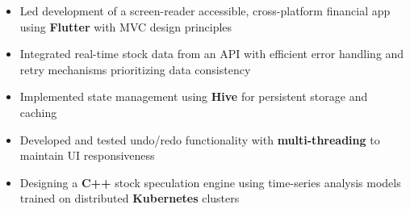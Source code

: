 \begin{itemize}
  \item Led development of a screen-reader accessible, cross-platform financial app using \textbf{Flutter} with MVC design principles
  \item Integrated real-time stock data from an API with efficient error handling and retry mechanisms prioritizing data consistency
  \item Implemented state management using \textbf{Hive} for persistent storage and caching
  \item Developed and tested undo/redo functionality with \textbf{multi-threading} to maintain UI responsiveness
  \item Designing a \textbf{C++} stock speculation engine using time-series analysis models trained on distributed \textbf{Kubernetes} clusters
\end{itemize}